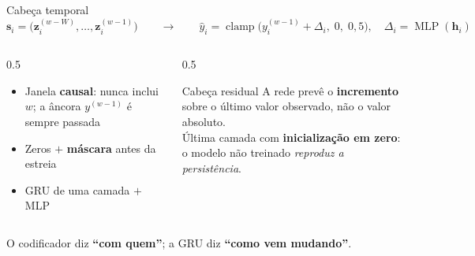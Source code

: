 \documentclass[aspectratio=169]{beamer}
\newcommand{\dest}[1]{\textcolor{ufprB}{\textbf{#1}}}
\newcommand{\azul}[1]{\textcolor{ufprA}{\textbf{#1}}}
\begin{document}
\begin{frame}{Cabeça temporal}
  \vfill
  \[ \mathbf{s}_i = \big( \mathbf{z}_i^{(w-W)}, \dots, \mathbf{z}_i^{(w-1)} \big)
     \qquad\longrightarrow\qquad
     \hat{y}_i = \operatorname{clamp}\big( y_i^{(w-1)} + \Delta_i,\; 0,\; 0{,}5 \big),
     \quad \Delta_i = \operatorname{MLP}(\mathbf{h}_i) \]
  \vfill
  \begin{columns}[T]
  \begin{column}{0.5\textwidth}
    \begin{itemize}
      \item Janela \dest{causal}: nunca inclui $w$; a âncora $y^{(w-1)}$ é sempre passada
      \item Zeros $+$ \azul{máscara} antes da estreia
      \item GRU de uma camada $+$ MLP
    \end{itemize}
  \end{column}
  \begin{column}{0.5\textwidth}
    \begin{block}{Cabeça residual}
      A rede prevê o \dest{incremento} sobre o último valor observado, não o valor
      absoluto.\\[0.4em]
      Última camada com \azul{inicialização em zero}: o modelo não treinado
      \emph{reproduz a persistência}.
    \end{block}
  \end{column}
  \end{columns}
  \vfill
  \begin{center}
  \small O codificador diz \azul{``com quem''}; a GRU diz \azul{``como vem mudando''}.
  \end{center}
  \vfill
\end{frame}
\end{document}
